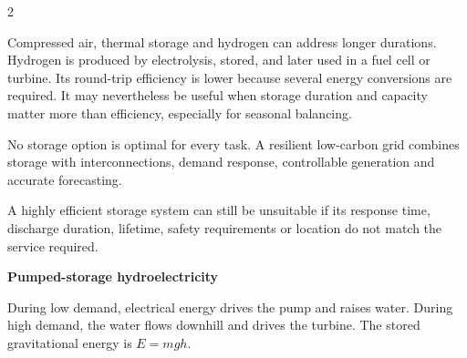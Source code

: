 \begin{multicols}{2}
\begin{ecarticle}
Compressed air, thermal storage and hydrogen can address longer durations. Hydrogen is
produced by electrolysis, stored, and later used in a fuel cell or turbine. Its round-trip
efficiency is lower because several energy conversions are required. It may nevertheless be
useful when storage duration and capacity matter more than efficiency, especially for
seasonal balancing.

No storage option is optimal for every task. A resilient low-carbon grid combines storage
with interconnections, demand response, controllable generation and accurate forecasting.
\end{ecarticle}

\begin{tcolorbox}[title=\sffamily\bfseries Did You Know?,colback=yellow!10,colframe=ECOrange]
A highly efficient storage system can still be unsuitable if its response time, discharge
duration, lifetime, safety requirements or location do not match the service required.
\end{tcolorbox}

\columnbreak

\begin{engineeringfocus}
\textbf{Pumped-storage hydroelectricity}

\begin{center}
\end{center}

During low demand, electrical energy drives the pump and raises water. During high demand,
the water flows downhill and drives the turbine. The stored gravitational energy is
$E=mgh$.
\end{engineeringfocus}


\end{multicols}
